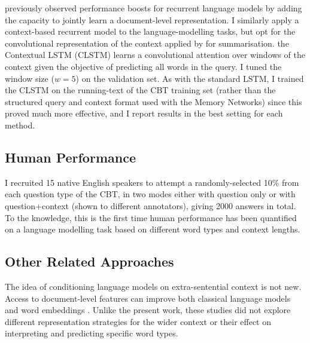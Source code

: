 \cite{mikolov2012context} previously observed performance boosts for recurrent language models by adding the capacity to jointly learn a document-level representation. I similarly apply a context-based recurrent model to the language-modelling tasks, but opt for the convolutional representation of the context applied by \cite{rush2015neural} for summarisation. the Contextual LSTM (CLSTM) learns a convolutional attention over windows of the context given the objective of predicting all words in the query. I tuned the window size (\(w=5\)) on the validation set. As with the standard LSTM, I trained the CLSTM on the running-text of the CBT training set (rather than the structured query and context format used with the Memory Networks) since this proved much more effective, and I  report results in the best setting for each method.

\subsection{Human Performance}

I recruited 15 native English speakers to attempt a randomly-selected 10\% from each question type of the CBT, in two modes either with question only or with question+context (shown to different annotators), giving 2000 answers in total.
To the knowledge, this is the first time human performance has been quantified on a language modelling task based on %
different word types and context lengths.


\subsection{Other Related Approaches}
The idea of conditioning language models on extra-sentential context is not new. Access to document-level features can improve both classical language models \citep{mikolov2012context} and word embeddings \citep{huang2012improving}. Unlike the present work, these studies did not explore different representation strategies for the wider context or their effect on interpreting and predicting specific word types.

